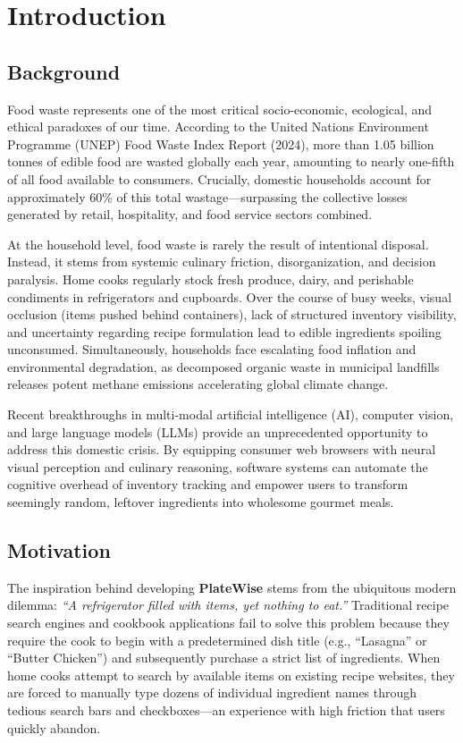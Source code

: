 \chapter{Introduction}

\section{Background}
Food waste represents one of the most critical socio-economic, ecological, and ethical paradoxes of our time. According to the United Nations Environment Programme (UNEP) Food Waste Index Report (2024), more than 1.05 billion tonnes of edible food are wasted globally each year, amounting to nearly one-fifth of all food available to consumers. Crucially, domestic households account for approximately 60\% of this total wastage—surpassing the collective losses generated by retail, hospitality, and food service sectors combined.

At the household level, food waste is rarely the result of intentional disposal. Instead, it stems from systemic culinary friction, disorganization, and decision paralysis. Home cooks regularly stock fresh produce, dairy, and perishable condiments in refrigerators and cupboards. Over the course of busy weeks, visual occlusion (items pushed behind containers), lack of structured inventory visibility, and uncertainty regarding recipe formulation lead to edible ingredients spoiling unconsumed. Simultaneously, households face escalating food inflation and environmental degradation, as decomposed organic waste in municipal landfills releases potent methane emissions accelerating global climate change.

Recent breakthroughs in multi-modal artificial intelligence (AI), computer vision, and large language models (LLMs) provide an unprecedented opportunity to address this domestic crisis. By equipping consumer web browsers with neural visual perception and culinary reasoning, software systems can automate the cognitive overhead of inventory tracking and empower users to transform seemingly random, leftover ingredients into wholesome gourmet meals.

\section{Motivation}
The inspiration behind developing \textbf{PlateWise} stems from the ubiquitous modern dilemma: \textit{“A refrigerator filled with items, yet nothing to eat.”} Traditional recipe search engines and cookbook applications fail to solve this problem because they require the cook to begin with a predetermined dish title (e.g., “Lasagna” or “Butter Chicken”) and subsequently purchase a strict list of ingredients. When home cooks attempt to search by available items on existing recipe websites, they are forced to manually type dozens of individual ingredient names through tedious search bars and checkboxes—an experience with high friction that users quickly abandon.

